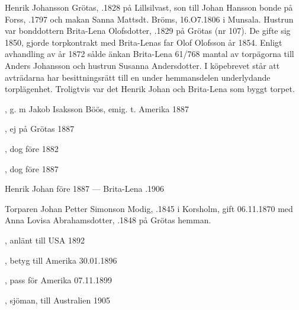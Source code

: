 Henrik Johansson Grötas, .1828 på Lillsilvast, son till Johan Hansson bonde på Forss, .1797 och makan Sanna Mattsdt. Bröms, \textborn 16.O7.1806 i Munsala. Hustrun var bonddottern Brita-Lena Olofsdotter, .1829 på Grötas (nr 107). De gifte sig 1850, gjorde torpkontrakt med Brita-Lenas far Olof Olofsson år 1854. Enligt avhandling av år 1872 sålde änkan Brita-Lena 61/768 mantal av torpägorna till Anders Johansson och hustrun Susanna Andersdotter. I köpebrevet står att avträdarna har besittningsrätt till en under hemmansdelen underlydande torplägenhet. Troligtvis var det Henrik Johan och Brita-Lena som byggt torpet.
\begin{jhchildren}
  \item {}
  \item {}, g. m Jakob Isaksson Böös, emig. t. Amerika 1887
  \item {}
  \item {}
  \item {}
  \item {}, ej på Grötas 1887
  \item {}, dog före 1882
  \item {}, dog före 1887
\end{jhchildren}
Henrik Johan \textdied före 1887  ---  Brita-Lena .1906





Torparen Johan Petter Simonson Modig, .1845 i Korsholm, gift 06.11.1870 med Anna Lovisa Abrahamsdotter,  .1848 på Grötas hemman.
\begin{jhchildren}
  \item {}, anlänt till USA 1892
  \item {}, betyg till Amerika 30.01.1896
  \item {}, pass för Amerika 07.11.1899
  \item {}, sjöman, till Australien 1905
\end{jhchildren}

